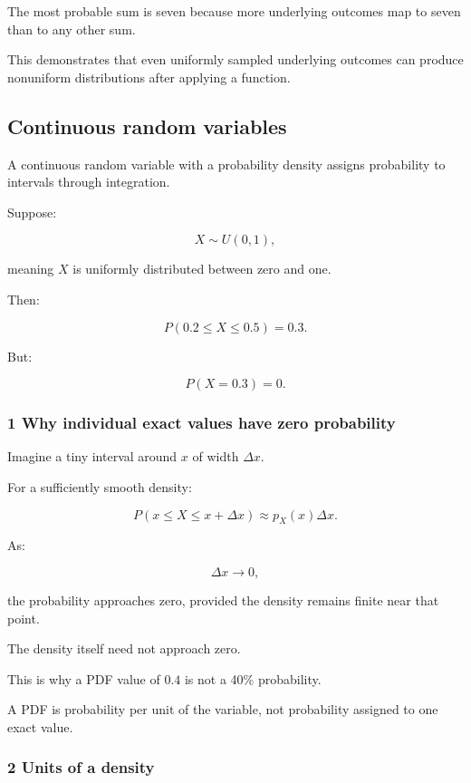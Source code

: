 The most probable sum is seven because more underlying outcomes map to seven than to any other sum.

This demonstrates that even uniformly sampled underlying outcomes can produce nonuniform distributions after applying a function.

\subsection{Continuous random variables}\label{02-foundations-ii-ch023-continuous-random-variables}

A continuous random variable with a probability density assigns probability to intervals through integration.

Suppose:

\[
 X\sim U(0,1),
\]

meaning \(X\) is uniformly distributed between zero and one.

Then:

\[
 P(0.2\le X\le0.5)=0.3.
\]

But:

\[
 P(X=0.3)=0.
\]

\subsubsection{1 Why individual exact values have zero probability}\label{02-foundations-ii-ch023-why-individual-exact-values-have-zero-probability}

Imagine a tiny interval around \(x\) of width \(\Delta x\).

For a sufficiently smooth density:

\[
 P(x\le X\le x+\Delta x) \approx p_X(x)\Delta x.
\]

As:

\[
 \Delta x\to0,
\]

the probability approaches zero, provided the density remains finite near that point.

The density itself need not approach zero.

This is why a PDF value of \(0.4\) is not a 40\% probability.

A PDF is probability per unit of the variable, not probability assigned to one exact value.

\subsubsection{2 Units of a density}\label{02-foundations-ii-ch023-units-of-a-density}

